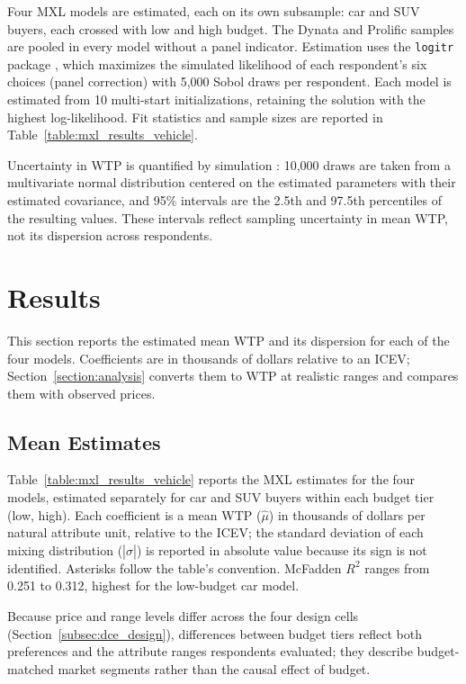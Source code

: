 \documentclass[a4paper,fleqn]{cas-sc}   %
\begin{document}
Four MXL models are estimated, each on its own subsample: car and SUV buyers, each crossed with low and high budget. The Dynata and Prolific samples are pooled in every model without a panel indicator. Estimation uses the \texttt{logitr} package \parencite{helvestonLogitrFastEstimation2023}, which maximizes the simulated likelihood of each respondent's six choices (panel correction) with 5,000 Sobol draws per respondent. Each model is estimated from 10 multi-start initializations, retaining the solution with the highest log-likelihood. Fit statistics and sample sizes are reported in Table~\ref{table:mxl_results_vehicle}.

Uncertainty in WTP is quantified by simulation \parencite{krinskyRobb1986}: 10,000 draws are taken from a multivariate normal distribution centered on the estimated parameters with their estimated covariance, and 95\% intervals are the 2.5th and 97.5th percentiles of the resulting values. These intervals reflect sampling uncertainty in mean WTP, not its dispersion across respondents.

\section{Results}
\label{section:results}

This section reports the estimated mean WTP and its dispersion for each of the four models. Coefficients are in thousands of dollars relative to an ICEV; Section~\ref{section:analysis} converts them to WTP at realistic ranges and compares them with observed prices.

\subsection{Mean Estimates}
\label{subsec:mxl_results}

Table~\ref{table:mxl_results_vehicle} reports the MXL estimates for the four models, estimated separately for car and SUV buyers within each budget tier (low, high). Each coefficient is a mean WTP ($\hat{\mu}$) in thousands of dollars per natural attribute unit, relative to the ICEV; the standard deviation of each mixing distribution ($|\hat{\sigma}|$) is reported in absolute value because its sign is not identified. Asterisks follow the table's convention. McFadden $R^2$ ranges from 0.251 to 0.312, highest for the low-budget car model.



Because price and range levels differ across the four design cells (Section~\ref{subsec:dce_design}), differences between budget tiers reflect both preferences and the attribute ranges respondents evaluated; they describe budget-matched market segments rather than the causal effect of budget.
\end{document}
